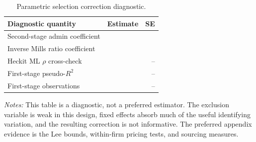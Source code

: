 \begin{table}[ht]
\centering
\caption{Parametric selection correction diagnostic.}
\label{tab:utg_heckman}
\begin{threeparttable}
\begin{tabular}{lrr}
\toprule
Diagnostic quantity & Estimate & SE \\
\midrule
Second-stage admin coefficient & \BPutgHeckmanCoef{} & \BPutgHeckmanSE{} \\
Inverse Mills ratio coefficient & \BPutgHeckmanLambda{} & \BPutgHeckmanLambdaSE{} \\
Heckit ML $\rho$ cross-check & \BPutgHeckmanRho{} & -- \\
First-stage pseudo-$R^2$ & \BPutgFirstStagePseudoR{} & -- \\
First-stage observations & \BPutgFirstStageN{} & -- \\
\bottomrule
\end{tabular}
\begin{tablenotes}[flushleft]\footnotesize
\item \textit{Notes:} This table is a diagnostic, not a preferred estimator. The exclusion variable is weak in this design, fixed effects absorb much of the useful identifying variation, and the resulting correction is not informative. The preferred appendix evidence is the Lee bounds, within-firm pricing tests, and sourcing measures.
\end{tablenotes}
\end{threeparttable}
\end{table}
